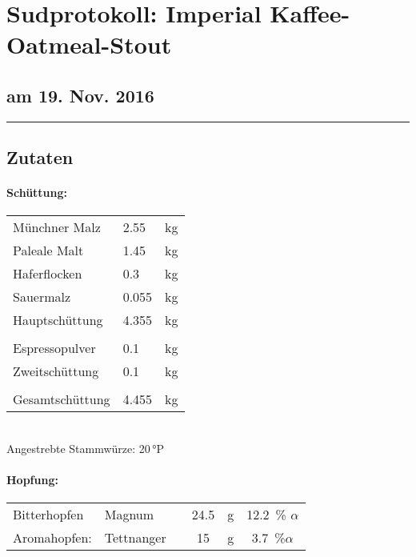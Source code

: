 \documentclass[12pt,oneside,a4paper]{scrartcl}
\begin{document}
	\begin{minipage}[c]{0.70\textwidth}
		\section*{\hspace{-.4cm}Sudprotokoll: Imperial Kaffee-Oatmeal-Stout }
	\end{minipage}
	\begin{minipage}[c]{0.29\textwidth}
		\subsection*{am 19. Nov. 2016}
	\end{minipage}
	\rule{\textwidth}{1pt}
%
\subsection*{Zutaten}
%
\paragraph{Schüttung:}
	\begin{tabular}[t]{m{8cm} m{2cm} m{1cm}}
		Münchner Malz & \num{2,55}  & kg \bigstrut\\
		Paleale Malt & \num{1,45} & kg \bigstrut\\
		Haferflocken & \num{0,3} & kg \bigstrut\\
		Sauermalz & \num{0,055} & kg \bigstrut\\ \hline
		Hauptschüttung & \num{4,355} & kg \bigstrut\\
		&&\\
		Espressopulver & \num{0,1} & kg \bigstrut\\\hline
		Zweitschüttung & \num{0,1} & kg \bigstrut\\
		&&\\\hline\hline
		Gesamtschüttung & \num{4,455} & kg\bigstrut
	\end{tabular}\\

\vspace{.25cm}
\hspace{1cm}Angestrebte Stammwürze: 20\,°P
%
\paragraph{Hopfung:}
	\begin{tabular}{l l c c c c}
		Bitterhopfen & Magnum &  & \num{24.5} &  \si{\gram}& \SI{12,2}{\percent} $\alpha$ \\
		Aromahopfen: & Tettnanger &  & \num{15} & \si{\gram} & \SI{3,7}{\percent}$\alpha$
	\end{tabular}\\
\end{document}
